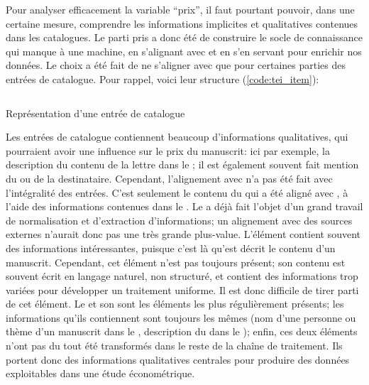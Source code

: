 Pour analyser efficacement la variable \enquote{prix}, il faut pourtant pouvoir, dans une certaine mesure, comprendre les informations implicites et qualitatives contenues dans les catalogues. Le parti pris a donc été de construire le socle de connaissance qui manque à une machine, en s'alignant avec \wkd{} et en s'en servant pour enrichir nos données. Le choix a été fait de ne s'aligner avec \wkd{} que pour certaines parties des entrées de catalogue. Pour rappel, voici leur structure (\ref{code:tei_item}):

\begin{listing}
	\inputminted[linenos, breaklines, tabsize=4]{xml}{code/tei_item.xml}
	\caption{Représentation \xmltei{} d'une entrée de catalogue}
	\label{code:tei_item}
\end{listing}


Les entrées de catalogue contiennent beaucoup d'informations qualitatives, qui pourraient avoir une influence sur le prix du manuscrit: ici par exemple, la description du contenu de la lettre dans le \tnote{}; il est également souvent fait mention du ou de la destinataire. Cependant, l'alignement avec \wkd{} n'a pas été fait avec l'intégralité des entrées. C'est seulement le contenu du \tname{} qui a été aligné avec \wkd{}, à l'aide des informations contenues dans le \ttrait{}. Le \tdesc{} a déjà fait l'objet d'un grand travail de normalisation et d'extraction d'informations; un alignement avec des sources externes n'aurait donc pas une très grande plus-value. L'élément \tnote{} contient souvent des informations intéressantes, puisque c'est là qu'est décrit le contenu d'un manuscrit. Cependant, cet élément n'est pas toujours présent; son contenu est souvent écrit en langage naturel, non structuré, et contient des informations trop variées pour développer un traitement uniforme. Il est donc difficile de tirer parti de cet élément. Le \tname{} et son \ttrait{} sont les éléments les plus régulièrement présents; les informations qu'ils contiennent sont toujours les mêmes (nom d'une personne ou thème d'un manuscrit dans le \tname{}, description du \tname{} dans le \ttrait{}); enfin, ces deux éléments n'ont pas du tout été transformés dans le reste de la chaîne de traitement. Ils portent donc des informations qualitatives centrales pour produire des données exploitables dans une étude économétrique.

